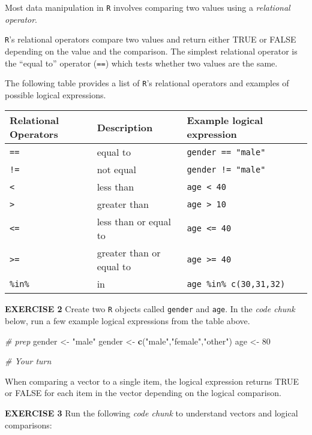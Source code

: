 \documentclass[
]{article}
\newenvironment{Shaded}{\begin{snugshade}}{\end{snugshade}}
\newcommand{\CommentTok}[1]{\textcolor[rgb]{0.56,0.35,0.01}{\textit{#1}}}
\newcommand{\DecValTok}[1]{\textcolor[rgb]{0.00,0.00,0.81}{#1}}
\newcommand{\KeywordTok}[1]{\textcolor[rgb]{0.13,0.29,0.53}{\textbf{#1}}}
\newcommand{\NormalTok}[1]{#1}
\newcommand{\StringTok}[1]{\textcolor[rgb]{0.31,0.60,0.02}{#1}}
\begin{document}
Most data manipulation in \texttt{R} involves comparing two values using
a \emph{relational operator}.

\texttt{R}'s relational operators compare two values and return either
TRUE or FALSE depending on the value and the comparison. The simplest
relational operator is the ``equal to'' operator (\texttt{==}) which
tests whether two values are the same.

The following table provides a list of \texttt{R}'s relational operators
and examples of possible logical expressions.

\begin{longtable}[]{@{}lll@{}}
\toprule
Relational Operators & Description & Example logical
expression\tabularnewline
\midrule
\endhead
\texttt{==} & equal to & \texttt{gender\ ==\ "male"}\tabularnewline
\texttt{!=} & not equal & \texttt{gender\ !=\ "male"}\tabularnewline
\texttt{\textless{}} & less than &
\texttt{age\ \textless{}\ 40}\tabularnewline
\texttt{\textgreater{}} & greater than &
\texttt{age\ \textgreater{}\ 10}\tabularnewline
\texttt{\textless{}=} & less than or equal to &
\texttt{age\ \textless{}=\ 40}\tabularnewline
\texttt{\textgreater{}=} & greater than or equal to &
\texttt{age\ \textgreater{}=\ 40}\tabularnewline
\texttt{\%in\%} & in & \texttt{age\ \%in\%\ c(30,31,32)}\tabularnewline
\bottomrule
\end{longtable}

\textbf{EXERCISE 2} Create two \texttt{R} objects called \texttt{gender}
and \texttt{age}. In the \emph{code chunk} below, run a few example
logical expressions from the table above.

\begin{Shaded}
\begin{Highlighting}[]
\CommentTok{# prep}
\NormalTok{gender <-}\StringTok{ "male"}
\NormalTok{gender <-}\StringTok{ }\KeywordTok{c}\NormalTok{(}\StringTok{"male"}\NormalTok{,}\StringTok{"female"}\NormalTok{,}\StringTok{"other"}\NormalTok{)}
\NormalTok{age    <-}\StringTok{ }\DecValTok{80}

\CommentTok{# Your turn}
\end{Highlighting}
\end{Shaded}

When comparing a vector to a single item, the logical expression returns
TRUE or FALSE for each item in the vector depending on the logical
comparison.

\textbf{EXERCISE 3} Run the following \emph{code chunk} to understand
vectors and logical comparisons:
\end{document}
